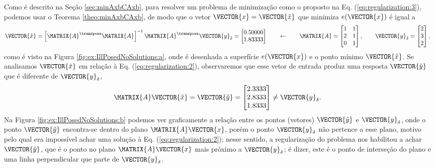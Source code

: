 \begin{SolutionT}
Como é descrito na Seção \ref{sec:minAxbCAxb}, para resolver um problema de minimização como o proposto na Eq. (\ref{eq:regularization:3}),
podemos usar o Teorema \ref{theo:minAxbCAxb}, de modo que o vetor $\VECTOR{x}=\VECTOR{\hat{x}}$ que minimiza $e(\VECTOR{x})$
é igual a
\begin{equation}\label{eq:regularization:3b}
\VECTOR{\hat{x}} =
\left[ \MATRIX{A}^{\transpose} \MATRIX{A} \right]^{-1}\MATRIX{A}^{\transpose}\VECTOR{y}_{\delta}
=
\begin{bmatrix}
0.50000 \\
1.83333
\end{bmatrix}
\qquad \leftarrow \qquad
\MATRIX{A}=
\begin{bmatrix}
1 & 1\\
2 & 1\\
0 & 1
\end{bmatrix},
\qquad
\VECTOR{y}_{\delta}=
\begin{bmatrix}
2\\
3\\
2
\end{bmatrix},
\end{equation}
como é visto na Figura \ref{fig:ex:IllPosedNoSolutions:a}, 
onde é desenhada a superfície $e(\VECTOR{x})$ e o ponto mínimo $\VECTOR{\hat{x}}$.
Se analisamos $\VECTOR{\hat{x}}$ em relação à Eq. (\ref{eq:regularization:2}),
observaremos que esse vetor de entrada produz uma resposta $\VECTOR{\hat{y}}$ que é diferente de $\VECTOR{y}_{\delta}$,
\begin{equation}
\MATRIX{A}\VECTOR{\hat{x}}= \VECTOR{\hat{y}} =
\begin{bmatrix}
2.3333\\
2.8333\\
1.8333
\end{bmatrix}
\neq \VECTOR{y}_{\delta}.
\end{equation}
Na Figura \ref{fig:ex:IllPosedNoSolutions:b} podemos ver graficamente a relação entre os pontos (vetores)
$\VECTOR{\hat{y}}$ e $\VECTOR{y}_{\delta}$,
onde o ponto $\VECTOR{\hat{y}}$ encontra-se dentro do plano $\MATRIX{A}\VECTOR{x}$,
porém o ponto $\VECTOR{y}_{\delta}$ não pertence a esse plano, 
motivo pelo qual era impossível achar uma solução à Eq. (\ref{eq:regularization:2});
nesse sentido, a regularização do problema nos habilitou a achar $\VECTOR{\hat{y}}$,
que é o ponto no plano  $\MATRIX{A}\VECTOR{x}$ mais próximo a $\VECTOR{y}_{\delta}$;
é dizer, este é o ponto de interseção do plano e uma linha perpendicular que parte de $\VECTOR{y}_{\delta}$.
\end{SolutionT}

